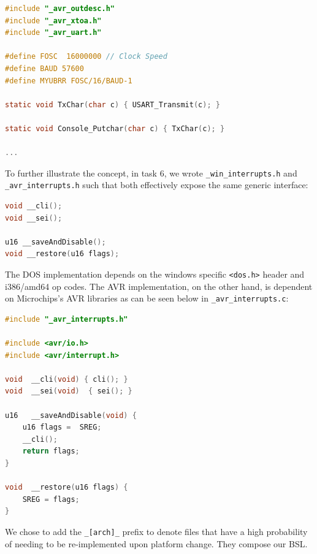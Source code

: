 \documentclass[11pt]{article}
\begin{document}
\begin{center}
    \begin{lstlisting}[language=C, columns=fixed, caption=Beginning of \_avr\_cout.c]
#include "_avr_outdesc.h"
#include "_avr_xtoa.h"
#include "_avr_uart.h"

#define FOSC  16000000 // Clock Speed
#define BAUD 57600
#define MYUBRR FOSC/16/BAUD-1

static void TxChar(char c) { USART_Transmit(c); }

static void Console_Putchar(char c) { TxChar(c); }

...
    \end{lstlisting}
\end{center}


To further illustrate the concept, in task 6, we wrote \lstinline[columns=fixed]{_win_interrupts.h} and \lstinline[columns=fixed]{_avr_interrupts.h} such that both effectively expose the same generic interface:

\begin{center}
    \begin{lstlisting}[language=C, columns=fixed, caption=Generic interface example.]
void __cli();
void __sei();

u16 __saveAndDisable();
void __restore(u16 flags);
    \end{lstlisting}
\end{center}

The DOS implementation depends on the windows specific \lstinline[columns=fixed]{<dos.h>} header and i386/amd64 op codes.
The AVR implementation, on the other hand, is dependent on Microchips's AVR libraries as can be seen below in \lstinline[columns=fixed]{_avr_interrupts.c}:

\begin{center}
    \begin{lstlisting}[language=C, columns=fixed, caption=\_avr\_interrupts.c]
#include "_avr_interrupts.h"

#include <avr/io.h>
#include <avr/interrupt.h>

void  __cli(void) { cli(); }
void  __sei(void)  { sei(); }

u16   __saveAndDisable(void) { 
    u16 flags =  SREG;
    __cli();
    return flags;
}

void  __restore(u16 flags) {
    SREG = flags;
}
    \end{lstlisting}
\end{center}

We chose to add the \lstinline[columns=fixed]{_[arch]_} prefix to denote files that have a high probability of needing to be re-implemented upon platform change. They compose our BSL.
\end{document}
